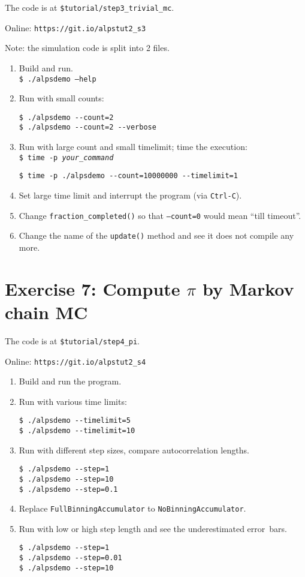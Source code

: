\documentclass[12pt]{article}
\newcommand{\code}[1]{\texttt{#1}}
\begin{document}
The code is at \texttt{\color{ballblue}\$tutorial/step3\_trivial\_mc}.

Online: \nolinkurl{https://git.io/alpstut2_s3}

Note: the simulation code is split into 2 files.

\begin{enumerate}
\item Build and run.\\
\code{\$ ./alpsdemo --help}
\item Run with small counts:
\begin{lstlisting}[]
$ ./alpsdemo --count=2
$ ./alpsdemo --count=2 --verbose
\end{lstlisting}
\item Run with large count and small timelimit; time the execution:\\
\code{\$ time -p \emph{your\_command}}
\begin{lstlisting}[emph={time}]
$ time -p ./alpsdemo --count=10000000 --timelimit=1
\end{lstlisting}%
\item Set large time limit and interrupt the program (via \code{Ctrl-C}).
\item Change \code{fraction\_completed()} so that \code{--count=0} would mean ``till timeout''.
\item Change the name of the \code{update()} method and see it does not compile any more.
\end{enumerate}

\section*{Exercise 7: Compute $\pi$ by Markov chain MC}

The code is at \texttt{\color{ballblue}\$tutorial/step4\_pi}.

Online: \nolinkurl{https://git.io/alpstut2_s4}

\begin{enumerate}
\item Build and run the program.
\item Run with various time limits:
  \begin{lstlisting}
$ ./alpsdemo --timelimit=5
$ ./alpsdemo --timelimit=10
  \end{lstlisting}
\item Run with different step sizes, compare autocorrelation lengths.
  \begin{lstlisting}
$ ./alpsdemo --step=1 
$ ./alpsdemo --step=10
$ ./alpsdemo --step=0.1
  \end{lstlisting} %
\item Replace \code{FullBinningAccumulator} to 
\code{NoBinningAccumulator}.
\item Run with low or high step length and see the underestimated error~bars.
  \begin{lstlisting}
$ ./alpsdemo --step=1
$ ./alpsdemo --step=0.01
$ ./alpsdemo --step=10
  \end{lstlisting} %
\end{enumerate}
\end{document}
